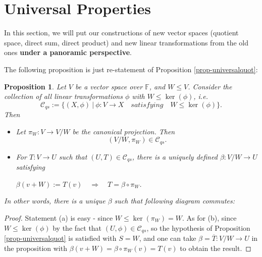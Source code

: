 \documentclass[12pt]{amsbook}
\newtheorem{proposition}[theorem]{Proposition}
\begin{document}
\section{Universal Properties}
In this section, we will put our constructions of new vector spaces (quotient space, direct sum, direct product) and new linear transformations from the old ones {\bf under a panoramic perspective}. 

\medskip
The following proposition is just re-statement of Proposition \ref{prop-universalquot}:
\begin{proposition} \label{prop-quot}
    Let $V$ be a vector space over $\mathbb{F}$, and $W \leq V$. Consider
    the collection of all linear transformations $\phi$ with $W \leq \ker(\phi)$, i.e.
    $$\mathcal{C}_{qs} := \{(X,\phi)\ |\ \phi: V \to X \quad satisfying \quad W \leq \ker(\phi)\}.$$
    Then
    \begin{itemize}
        \item[(a)] Let $\pi_W: V \to V/W$ be the canonical projection. Then
        $$(V/W, \pi_W) \in \mathcal{C}_{qs}.$$
        \item[(b)] For $T: V \to U$ such that $(U,T) \in \mathcal{C}_{qs}$, there is a uniquely defined $\beta: V/W \to U$ satisfying
        \begin{center}
        $\beta(v+W) := T(v) \quad \Rightarrow \quad T = \beta \circ \pi_W$.
        \end{center}
    \end{itemize}
In other words, there is a unique $\beta$ such that following diagram commutes:
\begin{center}
\end{center}
\end{proposition}
\begin{proof}
Statement (a) is easy - since $W \leq \ker(\pi_W) = W$. 
As for (b), since $W \leq \ker(\phi)$ by the fact that $(U,\phi) \in \mathcal{C}_{qs}$, so the hypothesis of Proposition \ref{prop-universalquot} is satisfied with $S = W$, and one can take $\beta = \overline{T}: V/W \to U$ in the proposition with $\beta(v+W) = \beta \circ \pi_W(v) = T(v)$ to obtain the result.
\end{proof}
\end{document}
